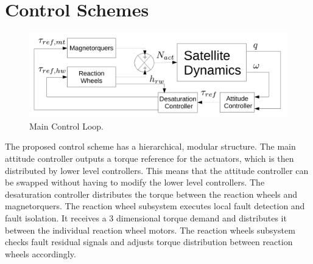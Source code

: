 \chapter{Control Schemes}

\begin{figure}[h!]
	\centering 
	\includegraphics[width=170mm]{figures/mainLoop.pdf}	
	\caption{Main Control Loop.}
	\label{label{fig:mainLoop}}
\end{figure}

The proposed control scheme has a hierarchical, modular structure. The main attitude controller outputs a torque reference for the actuators, which is then distributed by lower level controllers. This means that the attitude controller can be swapped without having to modify the lower level controllers. The desaturation controller distributes the torque between the reaction wheels and magnetorquers. The reaction wheel subsystem executes local fault detection and fault isolation. It receives a 3 dimensional torque demand and distributes it between the individual reaction wheel motors. The reaction wheels subsystem checks fault residual signals and adjusts torque distribution between reaction wheels accordingly. 






